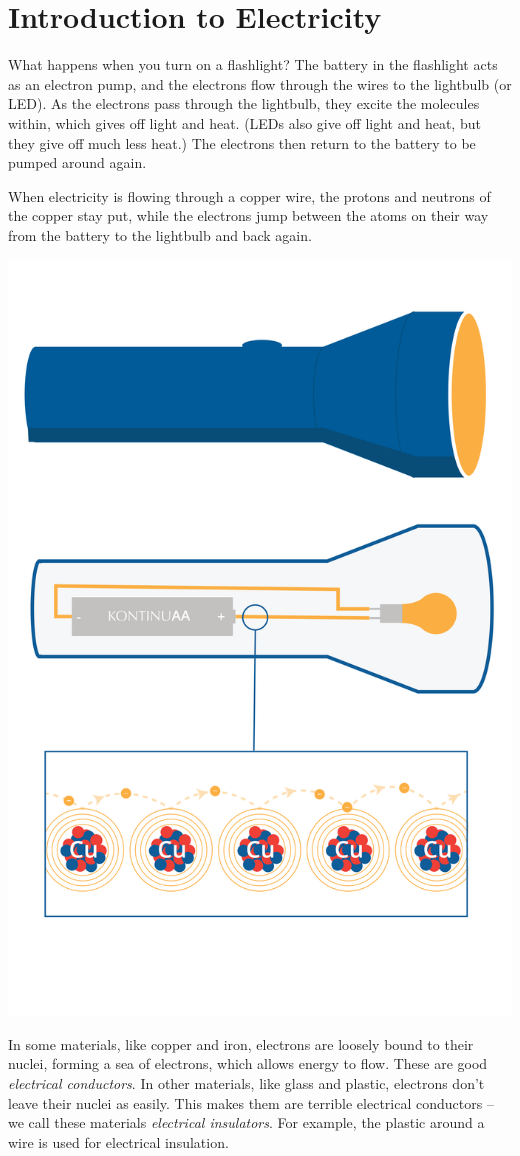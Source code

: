 \chapter{Introduction to Electricity}

What happens when you turn on a flashlight? The battery in the
flashlight acts as an electron pump, and the electrons flow through the
wires to the lightbulb (or LED). As the electrons pass through the
lightbulb, they excite the molecules within, which gives off light and
heat. (LEDs also give off light and heat, but they give off much less
heat.) The electrons then return to the battery to be pumped around
again.


When electricity is flowing through a copper wire, the protons and
neutrons of the copper stay put, while the electrons jump between the
atoms on their way from the battery to the lightbulb and back again.

\includegraphics[width=.5\textwidth]{flashlight.png}


In some materials, like copper and iron, electrons are loosely bound
to their nuclei, forming a sea of electrons, which allows energy to flow. These are good \textit{electrical conductors}. In
other materials, like glass and plastic, electrons don't leave their
nuclei as easily. This makes them are terrible electrical conductors -- we call
these materials \textit{electrical insulators}. For example, the plastic around a
wire is used for electrical insulation.

